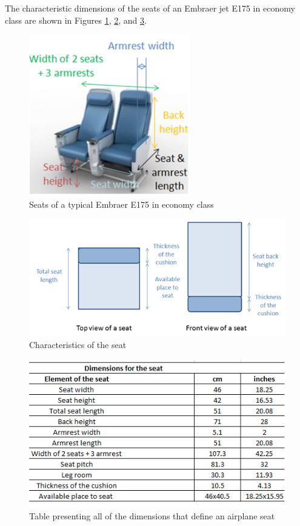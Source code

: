 The characteristic dimensions of the seats of an Embraer jet E175 in economy class are shown in Figures \ref{fig:seat_dimensions_1}, \ref{fig:seat_dimensions_2}, and \ref{fig:seat_dimensions_table}. \\
\begin{figure}[h]
\centering
\includegraphics[width=7cm]{images/seat_dimensions_image_global.png}
\caption{Seats of a typical Embraer E175 in economy class}
\label{fig:seat_dimensions_1}
\end{figure}

\begin{figure}[h]
\centering
\includegraphics[width=12cm]{images/seat_dimensions_image_topandfront_view.png}
\caption{Characteristics of the seat}
\label{fig:seat_dimensions_2}
\end{figure}

\begin{figure}[h]
\centering
\includegraphics[width=12cm]{images/seat_dimensions_table}
\caption{Table presenting all of the dimensions that define an airplane seat}
\label{fig:seat_dimensions_table}
\end{figure}

